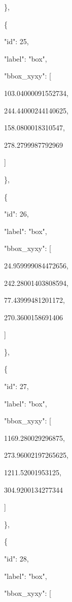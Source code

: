 \documentclass[10pt,a4paper]{article}
\begin{document}
    \},\allowbreak{}\par
    \{\par
      "id":\allowbreak{} 25,\allowbreak{}\par
      "label":\allowbreak{} "box",\allowbreak{}\par
      "bbox\_xyxy":\allowbreak{} [\par
        103.04000091552734,\allowbreak{}\par
        244.44000244140625,\allowbreak{}\par
        158.0800018310547,\allowbreak{}\par
        278.2799987792969\par
      ]\par
    \},\allowbreak{}\par
    \{\par
      "id":\allowbreak{} 26,\allowbreak{}\par
      "label":\allowbreak{} "box",\allowbreak{}\par
      "bbox\_xyxy":\allowbreak{} [\par
        24.959999084472656,\allowbreak{}\par
        242.28001403808594,\allowbreak{}\par
        77.43999481201172,\allowbreak{}\par
        270.3600158691406\par
      ]\par
    \},\allowbreak{}\par
    \{\par
      "id":\allowbreak{} 27,\allowbreak{}\par
      "label":\allowbreak{} "box",\allowbreak{}\par
      "bbox\_xyxy":\allowbreak{} [\par
        1169.280029296875,\allowbreak{}\par
        273.96002197265625,\allowbreak{}\par
        1211.52001953125,\allowbreak{}\par
        304.9200134277344\par
      ]\par
    \},\allowbreak{}\par
    \{\par
      "id":\allowbreak{} 28,\allowbreak{}\par
      "label":\allowbreak{} "box",\allowbreak{}\par
      "bbox\_xyxy":\allowbreak{} [\par
\end{document}
